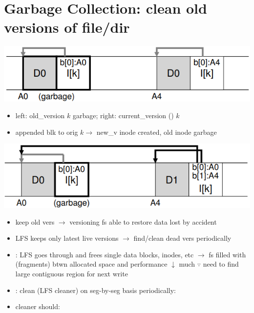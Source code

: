 \section*{Garbage Collection: clean old versions of file/dir}
\includegraphics[width=\linewidth]{imgs/lfs_garbage1}
\begin{itemize}
\item \faHandOUp left: old\_version $k$ garbage; right: current\_version () $k$
\item \faHandODown appended blk to orig $k \to$ new\_v inode created, old inode garbage
\end{itemize}
\includegraphics[width=\linewidth]{imgs/lfs_garbage2}
\begin{itemize}
\item keep old vers $\to$ versioning fs able to restore data lost by accident
\item LFS keeps only latest live versions $\to$ find/clean dead vers periodically
\item {}: LFS goes through and frees single data blocks, inodes, etc $\to$ fs filled with  (fragments) btwn allocated space and performance $\downarrow$ much $\because$ need to find large contiguous region for next write
\item {}: clean (LFS cleaner) on seg-by-seg basis periodically:
\item cleaner should:
\end{itemize}
